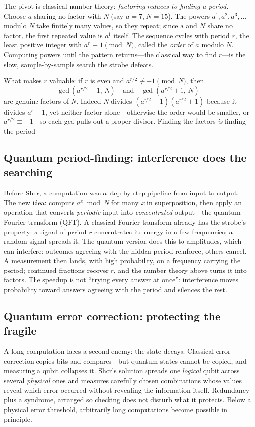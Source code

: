 The pivot is classical number theory: \emph{factoring reduces to finding a period.} Choose $a$ sharing no factor with $N$ (say $a=7$, $N=15$). The powers $a^1,a^2,a^3,\ldots$ modulo $N$ take finitely many values, so they repeat; since $a$ and $N$ share no factor, the first repeated value is $a^1$ itself. The sequence cycles with period $r$, the least positive integer with $a^r\equiv 1\pmod N$, called the \emph{order} of $a$ modulo $N$. Computing powers until the pattern returns---the classical way to find $r$---is the slow, sample-by-sample search the strobe defeats.

What makes $r$ valuable: if $r$ is even and $a^{r/2}\not\equiv -1\pmod N$, then
\[
\gcd(a^{r/2}-1,\,N)\quad\text{and}\quad\gcd(a^{r/2}+1,\,N)
\]
are genuine factors of $N$. Indeed $N$ divides $(a^{r/2}-1)(a^{r/2}+1)$ because it divides $a^r-1$, yet neither factor alone---otherwise the order would be smaller, or $a^{r/2}\equiv-1$---so each gcd pulls out a proper divisor. Finding the factors \emph{is} finding the period.

\subsection{Quantum period-finding: interference does the searching}

Before Shor, a computation was a step-by-step pipeline from input to output. The new idea: compute $a^x\bmod N$ for many $x$ in superposition, then apply an operation that converts \emph{periodic} input into \emph{concentrated} output---the quantum Fourier transform (QFT). A classical Fourier transform already has the strobe's property: a signal of period $r$ concentrates its energy in a few frequencies; a random signal spreads it. The quantum version does this to amplitudes, which can interfere: outcomes agreeing with the hidden period reinforce, others cancel. A measurement then lands, with high probability, on a frequency carrying the period; continued fractions recover $r$, and the number theory above turns it into factors. The speedup is not ``trying every answer at once'': interference moves probability toward answers agreeing with the period and silences the rest.

\subsection{Quantum error correction: protecting the fragile}

A long computation faces a second enemy: the state decays. Classical error correction copies bits and compares---but quantum states cannot be copied, and measuring a qubit collapses it. Shor's solution spreads one \emph{logical} qubit across several \emph{physical} ones and measures carefully chosen combinations whose values reveal which error occurred without revealing the information itself. Redundancy plus a syndrome, arranged so checking does not disturb what it protects. Below a physical error threshold, arbitrarily long computations become possible in principle.


